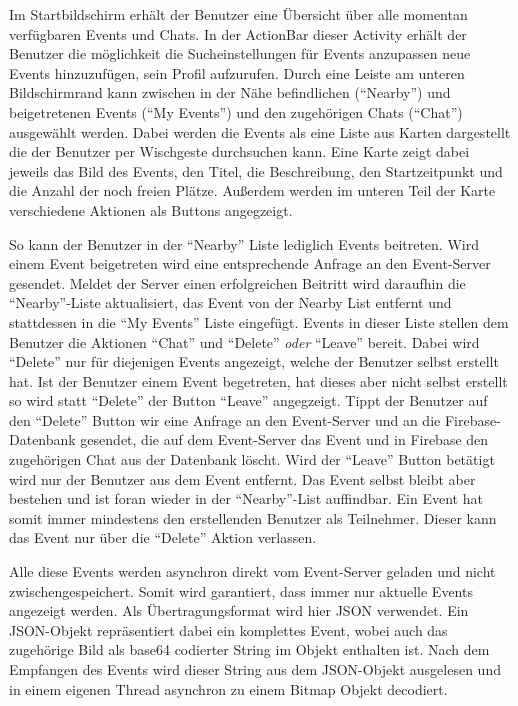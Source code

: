 \documentclass{scrartcl}
\begin{document}
Im Startbildschirm erhält der Benutzer eine Übersicht über alle momentan
verfügbaren Events und Chats. In der ActionBar dieser Activity erhält der
Benutzer die möglichkeit die Sucheinstellungen für Events anzupassen neue Events
hinzuzufügen, sein Profil aufzurufen. Durch eine Leiste am unteren
Bildschirmrand kann zwischen in der Nähe befindlichen (\enquote{Nearby}) und
beigetretenen Events (\enquote{My Events}) und den zugehörigen Chats
(\enquote{Chat}) ausgewählt werden. Dabei werden die Events als eine Liste aus
Karten dargestellt die der Benutzer per Wischgeste durchsuchen kann. Eine Karte
zeigt dabei jeweils das Bild des Events, den Titel, die Beschreibung, den
Startzeitpunkt und die Anzahl der noch freien Plätze. Außerdem werden im unteren
Teil der Karte verschiedene Aktionen als Buttons angegzeigt.

So kann der Benutzer in der \enquote{Nearby} Liste lediglich Events beitreten.
Wird einem Event beigetreten wird eine entsprechende Anfrage an den Event-Server
gesendet. Meldet der Server einen erfolgreichen Beitritt wird daraufhin die
\enquote{Nearby}-Liste aktualisiert, das Event von der Nearby List entfernt und
stattdessen in die \enquote{My Events} Liste eingefügt. Events in dieser Liste
stellen dem Benutzer die Aktionen \enquote{Chat} und \enquote{Delete}
\emph{oder} \enquote{Leave} bereit. Dabei wird \enquote{Delete} nur für
diejenigen Events angezeigt, welche der Benutzer selbst erstellt hat. Ist der
Benutzer einem Event begetreten, hat dieses aber nicht selbst erstellt so wird
statt \enquote{Delete} der Button \enquote{Leave} angegzeigt. Tippt der Benutzer
auf den \enquote{Delete} Button wir eine Anfrage an den Event-Server und an die
Firebase-Datenbank gesendet, die auf dem Event-Server das Event und in Firebase
den zugehörigen Chat aus der Datenbank löscht. Wird der \enquote{Leave} Button
betätigt wird nur der Benutzer aus dem Event entfernt. Das Event selbst bleibt
aber bestehen und ist foran wieder in der \enquote{Nearby}-List auffindbar. Ein
Event hat somit immer mindestens den erstellenden Benutzer als Teilnehmer.
Dieser kann das Event nur über die \enquote{Delete} Aktion verlassen.

Alle diese Events werden asynchron direkt vom Event-Server geladen und nicht
zwischengespeichert. Somit wird garantiert, dass immer nur aktuelle Events
angezeigt werden. Als Übertragungsformat wird hier JSON verwendet. Ein
JSON-Objekt repräsentiert dabei ein komplettes Event, wobei auch das zugehörige
Bild als base64 codierter String im Objekt enthalten ist. Nach dem Empfangen des
Events wird dieser String aus dem JSON-Objekt ausgelesen und in einem eigenen
Thread asynchron zu einem Bitmap Objekt decodiert.
\end{document}

